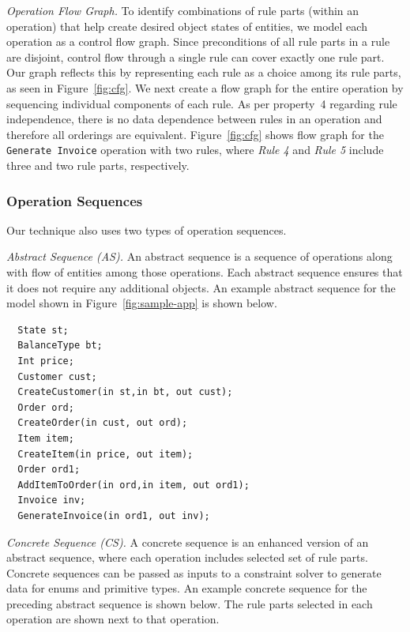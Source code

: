 \textit{Operation Flow Graph.} To identify combinations of rule parts (within an operation)
that help create desired object states of entities, we model each operation as a control
flow graph. Since preconditions of all rule parts in
a rule are disjoint, control flow through a single rule can cover
exactly one rule part. Our graph reflects this by
representing each rule as a choice among its rule parts, as
seen in Figure~\ref{fig:cfg}. We next create a flow graph for the entire
operation by sequencing individual components of each rule. As per property~4 regarding rule independence,
there is no data dependence between rules in an operation and therefore
all orderings are equivalent. Figure~\ref{fig:cfg} shows flow graph for 
the {\tt Generate Invoice} operation with two rules, where \textit{Rule 4}
and \textit{Rule 5} include three and two rule parts, respectively.

\subsubsection{Operation Sequences}
Our technique also uses two types of operation sequences.

\textit{Abstract Sequence (AS).} An abstract sequence is a sequence of operations along with
flow of entities among those operations. Each abstract sequence ensures that it does not 
require any additional objects. An example abstract sequence for the model shown in Figure~\ref{fig:sample-app} is shown below.

\vspace*{-5pt}
{\small
\begin{verbatim}
  State st;
  BalanceType bt;
  Int price;
  Customer cust;
  CreateCustomer(in st,in bt, out cust);
  Order ord;
  CreateOrder(in cust, out ord);	
  Item item;
  CreateItem(in price, out item);
  Order ord1;
  AddItemToOrder(in ord,in item, out ord1);
  Invoice inv;
  GenerateInvoice(in ord1, out inv);  
\end{verbatim}
}
\vspace*{-5pt}

\textit{Concrete Sequence (CS).} A concrete sequence is an enhanced version of an abstract sequence,
where each operation includes selected set of rule parts. Concrete sequences can be passed as
inputs to a constraint solver to generate data for enums and primitive types. An example concrete
sequence for the preceding abstract sequence is shown below. The rule parts selected in each 
operation are shown next to that operation.

